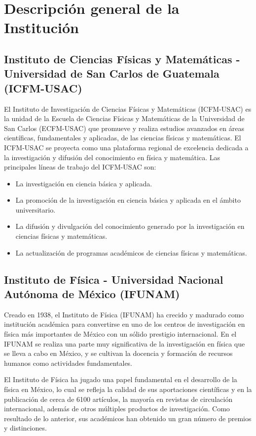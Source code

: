 \documentclass[11pt, spanish, letterpage]{article}
\begin{document}
\section{Descripción general de la Institución}
\subsection{Instituto de Ciencias Físicas y Matemáticas - Universidad de San Carlos de Guatemala (ICFM-USAC)}
El Instituto de Investigación de Ciencias Físicas y Matemáticas (ICFM-USAC) es la unidad de la Escuela de Ciencias Físicas y Matemáticas de la Universidad de San Carlos (ECFM-USAC) que promueve y realiza estudios avanzados en áreas científicas, fundamentales y aplicadas, de las ciencias físicas y matemáticas. El ICFM-USAC se proyecta como una plataforma regional de excelencia dedicada a la investigación y difusión del conocimiento en física y matemática. Las principales líneas de trabajo del ICFM-USAC son:
\begin{itemize}
	\item La investigación en ciencia básica y aplicada.
	\item La promoción de la investigación en ciencia básica y aplicada en el ámbito universitario.
	\item La difusión y divulgación del conocimiento generado por la investigación en ciencias físicas y matemáticas. 
	\item La actualización de programas académicos de ciencias físicas y matemáticas.
\end{itemize}

\subsection{Instituto de Física - Universidad Nacional Autónoma de México (IFUNAM)}
Creado en 1938, el Instituto de Física (IFUNAM) ha crecido y madurado como institución académica para convertirse en uno de los centros de investigación en física más importantes de México con un sólido prestigio internacional. En el IFUNAM se realiza una parte muy significativa de la investigación en física que se lleva a cabo en México, y se cultivan la docencia y formación de recursos humanos como actividades fundamentales.

El Instituto de Física ha jugado una papel fundamental en el desarrollo de la física en México, lo cual se refleja la calidad de sus aportaciones científicas y en la publicación de cerca de 6100 artículos, la mayoría en revistas de circulación internacional, además de otros múltiples productos de investigación. Como resultado de lo anterior, sus académicos han obtenido un gran número de premios y distinciones.
\end{document}
